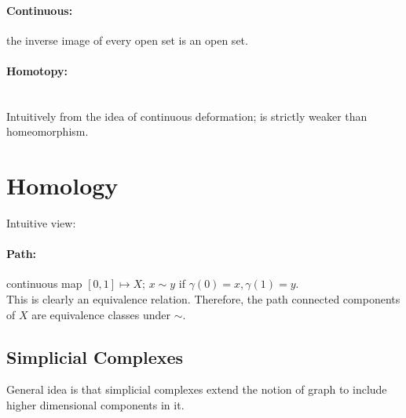 \documentclass[10pt,a4paper]{report}
\begin{document}
\paragraph{Continuous:}the inverse image of every open set is an open set.

\paragraph{Homotopy:}\\
Intuitively from the idea of continuous deformation; is strictly weaker than homeomorphism.

\section{Homology}
Intuitive view:\\
\paragraph{Path:} continuous map $[0,1]\mapsto X$; $x\sim y$ if $\gamma(0)=x,\gamma(1)=y$.\\
This is clearly an equivalence relation. Therefore, the path connected components of $X$ are equivalence classes under $\sim$.
\subsection{Simplicial Complexes}
General idea is that simplicial complexes extend the notion of graph to include higher dimensional components in it.
\end{document}
